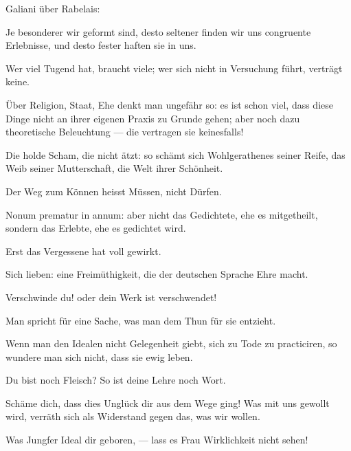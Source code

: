 Galiani über Rabelais: 
\par

Je besonderer wir geformt sind, desto seltener finden wir uns congruente Erlebnisse, und desto fester haften sie in uns.
\par

Wer viel Tugend hat, braucht viele; wer sich nicht in Versuchung führt, verträgt keine.
\par

Über Religion, Staat, Ehe denkt man ungefähr so: es ist schon viel, dass diese Dinge nicht an ihrer eigenen Praxis zu Grunde gehen; aber noch dazu theoretische Beleuchtung — die vertragen sie keinesfalls!
\par

Die holde Scham, die nicht ätzt: so schämt sich Wohlgerathenes seiner Reife, das Weib seiner Mutterschaft, die Welt ihrer Schönheit.
\par

Der Weg zum Können heisst Müssen, nicht Dürfen.
\par

Nonum prematur in annum: aber nicht das Gedichtete, ehe es mitgetheilt, sondern das Erlebte, ehe es gedichtet wird.
\par

Erst das Vergessene hat voll gewirkt.
\par

Sich lieben: eine Freimüthigkeit, die der deutschen Sprache Ehre macht.
\par

Verschwinde du! oder dein Werk ist verschwendet!
\par

Man spricht für eine Sache, was man dem Thun für sie entzieht.
\par

Wenn man den Idealen nicht Gelegenheit giebt, sich zu Tode zu practiciren, so wundere man sich nicht, dass sie ewig leben.
\par

Du bist noch Fleisch? So ist deine Lehre noch Wort.
\par

Schäme dich, dass dies Unglück dir aus dem Wege ging! Was mit uns gewollt wird, verräth sich als Widerstand gegen das, was wir wollen.
\par

Was Jungfer Ideal dir geboren, — lass es Frau Wirklichkeit nicht sehen!
\par

